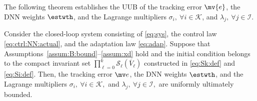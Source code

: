 \documentclass[letterpaper, journal]{IEEEtran}
\begin{document}
The following theorem establishes the UUB of the tracking error $\mv{e}$, the DNN weights $\estwth$, and the Lagrange multipliers $\sigma_i,\ \forall i \in \mathcal{K}$, and $\lambda_j,\ \forall j \in \mathcal{I}$.

\begin{theorem} \label{thm:stability}
  Consider the closed-loop system consisting of \eqref{eq:sys}, the control law \eqref{eq:ctrl:NN:actual}, and the adaptation law \eqref{eq:adap}.
  Suppose that Assumptions~\ref{assum:B:bound}--\ref{assum:xd} hold and the initial condition belongs to the compact invariant set 
  $
  \prod_{\ell=0}^k \mathcal{S}_\ell(\overline V_\ell)
  $ 
  constructed in \eqref{eq:Sk:def} and \eqref{eq:Si:def}.
  Then, the tracking error $\mv e$, the DNN weights $\estwth$, and the Lagrange multipliers $\sigma_i,\ \forall i \in \mathcal{K},$ and $\lambda_j,\ \forall j \in \mathcal{I},$ are uniformly ultimately bounded.
\end{theorem}
\end{document}
